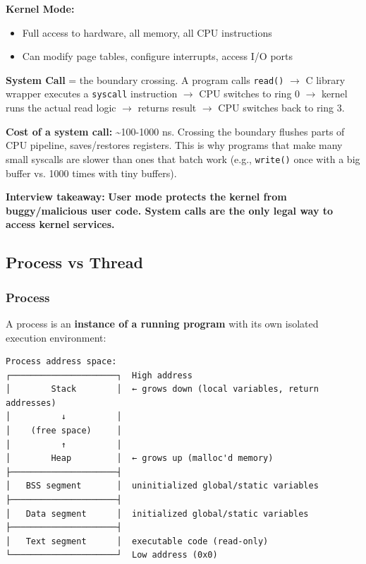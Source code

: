 \documentclass[11pt]{article}
\providecommand{\tightlist}{\setlength{\itemsep}{1pt}\setlength{\parskip}{0pt}}
\begin{document}
\textbf{Kernel Mode:}

\begin{itemize}
\tightlist
\item
  Full access to hardware, all memory, all CPU instructions
\item
  Can modify page tables, configure interrupts, access I/O ports
\end{itemize}

\textbf{System Call} = the boundary crossing. A program calls \texttt{read()} \(\rightarrow\) C library wrapper executes a \texttt{syscall} instruction \(\rightarrow\) CPU switches to ring 0 \(\rightarrow\) kernel runs the actual read logic \(\rightarrow\) returns result \(\rightarrow\) CPU switches back to ring 3.

\textbf{Cost of a system call:} \textasciitilde100-1000 ns. Crossing the boundary flushes parts of CPU pipeline, saves/restores registers. This is why programs that make many small syscalls are slower than ones that batch work (e.g., \texttt{write()} once with a big buffer vs. 1000 times with tiny buffers).

\textbf{Interview takeaway:} \textbf{User mode protects the kernel from buggy/malicious user code. System calls are the only legal way to access kernel services.}

\subsection{Process vs Thread}\label{process-vs-thread}

\subsubsection{Process}\label{process}

A process is an \textbf{instance of a running program} with its own isolated execution environment:

\setcodelang{}

\begin{verbatim}
Process address space:
┌─────────────────────┐  High address
│        Stack        │  ← grows down (local variables, return addresses)
│          ↓          │
│    (free space)     │
│          ↑          │
│        Heap         │  ← grows up (malloc'd memory)
├─────────────────────┤
│   BSS segment       │  uninitialized global/static variables
├─────────────────────┤
│   Data segment      │  initialized global/static variables
├─────────────────────┤
│   Text segment      │  executable code (read-only)
└─────────────────────┘  Low address (0x0)
\end{verbatim}
\end{document}
